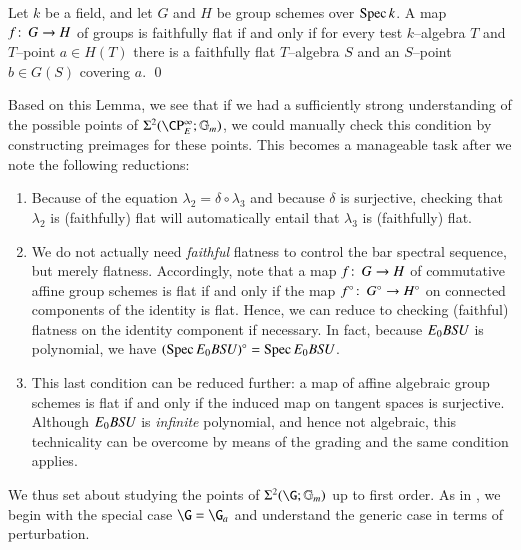 \begin{lemma}
Let $k$ be a field, and let $G$ and $H$ be group schemes over $\operatorname{Spec} k$.  A map $f\colon\thinspace G \to H$ of groups is faithfully flat if and only if for every test $k$--algebra $T$ and $T$--point $a \in H(T)$ there is a faithfully flat $T$--algebra $S$ and an $S$--point $b \in G(S)$ covering $a$. \qed
\end{lemma}

\noindent Based on this Lemma, we see that if we had a sufficiently strong understanding of the possible points of $\Sigma^2(\CP^\infty_E; \Gm)$, we could manually check this condition by constructing preimages for these points.  This becomes a manageable task after we note the following reductions:
\begin{enumerate}
    \item Because of the equation $\lambda_2 = \delta \circ \lambda_3$ and because $\delta$ is surjective, checking that $\lambda_2$ is (faithfully) flat will automatically entail that $\lambda_3$ is (faithfully) flat.
    \item We do not actually need \emph{faithful} flatness to control the bar spectral sequence, but merely flatness.  Accordingly, note that a map $f\colon\thinspace G \to H$ of commutative affine group schemes is flat if and only if the map $f^\circ\colon\thinspace G^\circ \to H^\circ$ on connected components of the identity is flat.  Hence, we can reduce to checking (faithful) flatness on the identity component if necessary.  In fact, because $E_0 B\mathit{SU}$ is polynomial, we have $(\operatorname{Spec} E_0 B\mathit{SU})^\circ = \operatorname{Spec} E_0 B\mathit{SU}$.
    \item This last condition can be reduced further: a map of affine algebraic group schemes is flat if and only if the induced map on tangent spaces is surjective.  Although $E_0 B\mathit{SU}$ is \emph{infinite} polynomial, and hence not algebraic, this technicality can be overcome by means of the grading and the same condition applies.
\end{enumerate}

We thus set about studying the points of $\Sigma^2(\G; \Gm)$ up to first order.  As in , we begin with the special case $\G = \G_a$ and understand the generic case in terms of perturbation.

